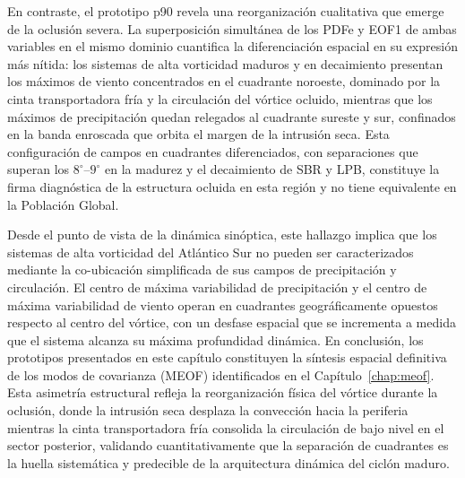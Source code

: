 En contraste, el prototipo p90 revela una reorganización cualitativa que emerge de la oclusión severa. La superposición simultánea de los PDFe y EOF1 de ambas variables en el mismo dominio cuantifica la diferenciación espacial en su expresión más nítida: los sistemas de alta vorticidad maduros y en decaimiento presentan los máximos de viento concentrados en el cuadrante noroeste, dominado por la cinta transportadora fría y la circulación del vórtice ocluido, mientras que los máximos de precipitación quedan relegados al cuadrante sureste y sur, confinados en la banda enroscada que orbita el margen de la intrusión seca. Esta configuración de campos en cuadrantes diferenciados, con separaciones que superan los $8^{\circ}$--$9^{\circ}$ en la madurez y el decaimiento de SBR y LPB, constituye la firma diagnóstica de la estructura ocluida en esta región y no tiene equivalente en la Población Global.

Desde el punto de vista de la dinámica sinóptica, este hallazgo implica que los sistemas de alta vorticidad del Atlántico Sur no pueden ser caracterizados mediante la co-ubicación simplificada de sus campos de precipitación y circulación.
El centro de máxima variabilidad de precipitación y el centro de máxima variabilidad de viento operan en cuadrantes geográficamente opuestos respecto al centro del vórtice, con un desfase espacial que se incrementa a medida que el sistema alcanza su máxima profundidad dinámica.
En conclusión, los prototipos presentados en este capítulo constituyen la síntesis espacial definitiva de los modos de covarianza (MEOF) identificados en el Capítulo~\ref{chap:meof}. Esta asimetría estructural refleja la reorganización física del vórtice durante la oclusión, donde la intrusión seca desplaza la convección hacia la periferia mientras la cinta transportadora fría consolida la circulación de bajo nivel en el sector posterior, validando cuantitativamente que la separación de cuadrantes es la huella sistemática y predecible de la arquitectura dinámica del ciclón maduro.

